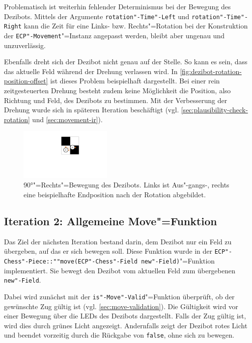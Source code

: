 Problematisch ist weiterhin fehlender Determinismus bei der Bewegung des Dezibots. Mittels der Argumente \texttt{rotation"-Time"-Left} und \texttt{rotation"-Time"-Right} kann die Zeit für eine Links- bzw. Rechts"=Rotation bei der Konstruktion der \texttt{ECP"-Movement}"=Instanz angepasst werden, bleibt aber ungenau und unzuverlässig.

Ebenfalls dreht sich der Dezibot nicht genau auf der Stelle. So kann es sein, dass das aktuelle Feld während der Drehung verlassen wird. In \autoref{fig:dezibot-rotation-position-offset} ist dieses Problem beispielhaft dargestellt. Bei einer rein zeitgesteuerten Drehung besteht zudem keine Möglichkeit die Position, also Richtung und Feld, des Dezibots zu bestimmen. Mit der Verbesserung der Drehung wurde sich in späteren Iteration beschäftigt (vgl. \autoref{sec:plausibility-check-rotation} und \autoref{sec:movement-ir}).

\begin{figure}[h]
    \centering
    \includegraphics[width=0.4\textwidth]{../assets/dezibot_rotation_position_offset.pdf}
    \caption{90°"=Rechts"=Bewegung des Dezibots. Links ist Aus"-gangs-, rechts eine beispielhafte Endposition nach der Rotation abgebildet.}
    \label{fig:dezibot-rotation-position-offset}
\end{figure}


\subsection{Iteration 2: Allgemeine Move"=Funktion}
\label{sec:general-move-function}

Das Ziel der nächsten Iteration bestand darin, dem Dezibot nur ein Feld zu übergeben, auf das er sich bewegen soll. Diese Funktion wurde in der \texttt{ECP"-Chess"-Piece::""move(ECP"-Chess"-Field new"-Field)}"=Funktion implementiert. Sie bewegt den Dezibot vom aktuellen Feld zum übergebenen \texttt{new"-Field}.

Dabei wird zunächst mit der \texttt{is"-Move"-Valid}"=Funktion überprüft, ob der gewünschte Zug gültig ist (vgl. \autoref{sec:move-validation}). Die Gültigkeit wird vor einer Bewegung über die LEDs des Dezibots dargestellt. Falls der Zug gültig ist, wird dies durch grünes Licht angezeigt. Andernfalls zeigt der Dezibot rotes Licht und beendet vorzeitig durch die Rückgabe von \texttt{false}, ohne sich zu bewegen.

